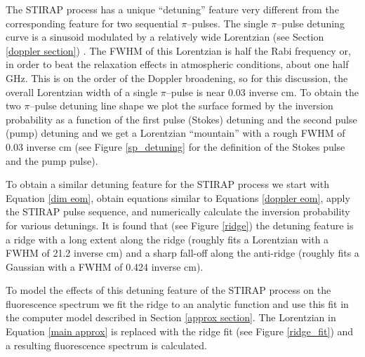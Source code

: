 \label{STIRAP ridge section}


The STIRAP process has a unique ``detuning'' feature very different from the corresponding feature for two sequential $\pi$--pulses. The single $\pi$--pulse detuning curve is a sinusoid modulated by a relatively wide Lorentzian (see Section \ref{doppler section}) . The FWHM of this Lorentzian is half the Rabi frequency or, in order to beat the relaxation effects in atmospheric conditions, about one half GHz. This is on the order of the Doppler broadening, so for this discussion, the overall Lorentzian width of a single $\pi$--pulse is near 0.03 inverse cm. To obtain the two $\pi$--pulse detuning line shape we plot the surface formed by the inversion probability as a function of the first pulse (Stokes) detuning and the second pulse (pump) detuning and we get a Lorentzian ``mountain'' with a rough FWHM of 0.03 inverse cm (see Figure \ref{sp_detuning} for the definition of the Stokes pulse and the pump pulse).


To obtain a similar detuning feature for the STIRAP process we start with Equation \ref{dim eom}, obtain equations similar to Equations \ref{doppler eom}, apply the STIRAP pulse sequence, and numerically calculate the inversion probability for various detunings. It is found that (see Figure \ref{ridge}) the detuning feature is a ridge with a long extent along the ridge (roughly fits a Lorentzian with a FWHM of 21.2 inverse cm) and a sharp fall-off along the anti-ridge (roughly fits a Gaussian with a FWHM of 0.424 inverse cm).



To model the effects of this detuning feature of the STIRAP process on the fluorescence spectrum we fit the ridge to an analytic function and use this fit in the computer model described in Section \ref{approx section}. The Lorentzian in Equation \ref{main approx} is replaced with the ridge fit (see Figure \ref{ridge_fit}) and a resulting fluorescence spectrum is calculated.

